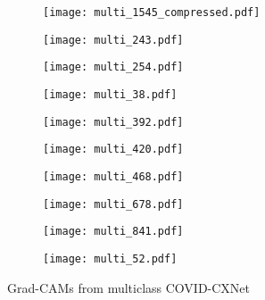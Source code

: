 \documentclass{article}
\begin{document}
\begin{figure}[H]
\begin{subfigure}{0.4\linewidth}
        \centering
        \texttt{[image: multi\_1545\_compressed.pdf]}
        \label{fig:multiclass7}
    \end{subfigure}
\begin{subfigure}{0.4\linewidth}
        \centering
        \texttt{[image: multi\_243.pdf]}
        \label{fig:multiclass8}
    \end{subfigure}
\begin{subfigure}{0.4\linewidth}
        \centering
        \texttt{[image: multi\_254.pdf]}
        \label{fig:multiclass9}
    \end{subfigure}
\begin{subfigure}{0.4\linewidth}
        \centering
        \texttt{[image: multi\_38.pdf]}
        \label{fig:multiclass10}
    \end{subfigure}
\begin{subfigure}{0.4\linewidth}
        \centering
        \texttt{[image: multi\_392.pdf]}
        \label{fig:multiclass11}
    \end{subfigure}
\begin{subfigure}{0.4\linewidth}
        \centering
        \texttt{[image: multi\_420.pdf]}
        \label{fig:multiclass12}
    \end{subfigure}
    \hfill
    \begin{subfigure}{0.4\linewidth}
        \centering
        \texttt{[image: multi\_468.pdf]}
        \label{fig:multiclass13}
    \end{subfigure}
    \hfill
    \begin{subfigure}{0.4\linewidth}
        \centering
        \texttt{[image: multi\_678.pdf]}
        \label{fig:multiclass14}
    \end{subfigure}
    \hfill
    \begin{subfigure}{0.4\linewidth}
        \centering
        \texttt{[image: multi\_841.pdf]}
        \label{fig:multiclass15}
    \end{subfigure}
    \hfill
    \begin{subfigure}{0.4\linewidth}
        \centering
        \texttt{[image: multi\_52.pdf]}
        \label{fig:multiclass16}
    \end{subfigure}
\caption{Grad-CAMs from multiclass COVID-CXNet}
\label{fig:more_multi_cxnet}
\end{figure}
\end{document}
